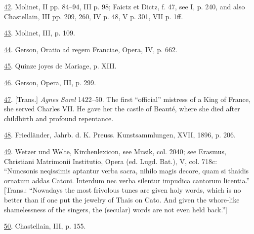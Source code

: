 \protect\hypertarget{23_NOTES.xhtmlux5cux23id_1188}{\protect\hyperlink{13_Chapter_Six__THE_DEPICTION_OF_TH.xhtmlux5cux23id_1187}{42}}.
Molinet, II pp. 84--94, III p. 98; Faictz et Dictz, f. 47, see I, p.
240, and also Chastellain, III pp. 209, 260, IV p. 48, V p. 301, VII p.
1ff.

\protect\hypertarget{23_NOTES.xhtmlux5cux23id_1186}{\protect\hyperlink{13_Chapter_Six__THE_DEPICTION_OF_TH.xhtmlux5cux23id_1185}{43}}.
Molinet, III, p. 109.

\protect\hypertarget{23_NOTES.xhtmlux5cux23id_1184}{\protect\hyperlink{13_Chapter_Six__THE_DEPICTION_OF_TH.xhtmlux5cux23id_1183}{44}}.
Gerson, Oratio ad regem Franciae, Opera, IV, p. 662.

\protect\hypertarget{23_NOTES.xhtmlux5cux23id_1182}{\protect\hyperlink{13_Chapter_Six__THE_DEPICTION_OF_TH.xhtmlux5cux23id_1181}{45}}.
Quinze joyes de Mariage, p. XIII.

\protect\hypertarget{23_NOTES.xhtmlux5cux23id_1180}{\protect\hyperlink{13_Chapter_Six__THE_DEPICTION_OF_TH.xhtmlux5cux23id_1179}{46}}.
Gerson, Opera, III, p. 299.

\protect\hypertarget{23_NOTES.xhtmlux5cux23id_1178}{\protect\hyperlink{13_Chapter_Six__THE_DEPICTION_OF_TH.xhtmlux5cux23id_1177}{47}}.
{[}Trans.{]} \emph{Agnes Sorel} 1422--50. The first ``official''
mistress of a King of France, she served Charles VII. He gave her the
castle of Beauté, where she died after childbirth and profound
repentance.

\protect\hypertarget{23_NOTES.xhtmlux5cux23id_1176}{\protect\hyperlink{13_Chapter_Six__THE_DEPICTION_OF_TH.xhtmlux5cux23id_1175}{48}}.
Friedländer, Jahrb. d. K. Preuss. Kunstsammlungen, XVII, 1896, p. 206.

\protect\hypertarget{23_NOTES.xhtmlux5cux23id_1174}{\protect\hyperlink{13_Chapter_Six__THE_DEPICTION_OF_TH.xhtmlux5cux23id_1173}{49}}.
Wetzer und Welte, Kirchenlexicon, see Musik, col. 2040; see Erasmus,
Christiani Matrimonii Institutio, Opera (ed. Lugd. Bat.), V, col. 718c:
``Nunc\protect\hypertarget{23_NOTES.xhtmlux5cux23page_418}{}{}sonis
neqissimis aptantur verba sacra, nihilo magis decore, quam si thaidis
ornatum addas Catoni. Interdum nec verba silentur impudica cantorum
licentia.'' {[}Trans.: ``Nowadays the most frivolous tunes are given
holy words, which is no better than if one put the jewelry of Thais on
Cato. And given the whore-like shamelessness of the singers, the
(secular) words are not even held back.''{]}

\protect\hypertarget{23_NOTES.xhtmlux5cux23id_1172}{\protect\hyperlink{13_Chapter_Six__THE_DEPICTION_OF_TH.xhtmlux5cux23id_1171}{50}}.
Chastellain, III, p. 155.

